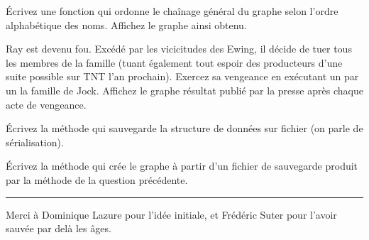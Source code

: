 \documentclass[10pt]{article}\usepackage[correction]{exemptty}
\begin{document}
\Question Écrivez une fonction qui ordonne le chaînage général du graphe selon
l'ordre alphabétique des noms. Affichez le graphe ainsi obtenu.

\Question Ray est devenu fou. Excédé par les vicicitudes des Ewing, il décide
de tuer tous les membres de la famille (tuant également tout espoir des
producteurs d'une suite possible sur TNT l'an prochain).  Exercez sa vengeance
en exécutant un par un la famille de Jock. Affichez le graphe résultat publié
par la presse après chaque acte de vengeance.

\Question Écrivez la méthode qui sauvegarde la structure de données sur fichier
(on parle de sérialisation).

\Question Écrivez la méthode qui crée le graphe à partir d'un fichier de
sauvegarde produit par la méthode de la question précédente.

\vfill
\hrule

\medskip\noindent
Merci à Dominique Lazure pour l'idée initiale, et Frédéric Suter pour
l'avoir sauvée par delà les âges.

\begin{figure}
  \centering

\end{figure}
\end{document}
